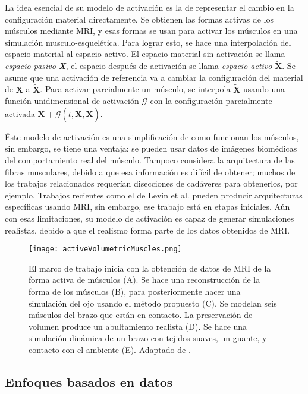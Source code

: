 La idea esencial de su modelo de activación es la de representar el cambio en la configuración material directamente. Se obtienen las formas activas de los músculos mediante MRI, y esas formas se usan para activar los músculos en una simulación musculo-esquelética. Para lograr esto, se hace una interpolación del espacio material al espacio activo. El espacio material sin activación se llama \textit{espacio pasivo} \textbf{\textit{X}}, el espacio después de activación se llama \textit{espacio activo} $\tilde{\textbf{X}}$. Se asume que una activación de referencia va a cambiar la configuración del material de $\textbf{X}$ a $\tilde{\textbf{X}}$. Para activar parcialmente un músculo, se interpola $\tilde{\textbf{X}}$ usando una función unidimensional de activación $\mathcal{G}$ con la configuración parcialmente activada $\textbf{X} + \mathcal{G}(t,\tilde{\textbf{X}},\textbf{X})$.

Éste modelo de activación es una simplificación de como funcionan los músculos, sin embargo, se tiene una ventaja: se pueden usar datos de imágenes biomédicas del comportamiento real del músculo. Tampoco considera la arquitectura de las fibras musculares, debido a que esa información es difícil de obtener; muchos de los trabajos relacionados requerían disecciones de cadáveres para obtenerlos, por ejemplo. Trabajos recientes como el de Levin et al. \citep{levin2011extracting} pueden producir arquitecturas específicas usando MRI, sin embargo, ese trabajo está en etapas iniciales. Aún con esas limitaciones, su modelo de activación es capaz de generar simulaciones realistas, debido a que el realismo forma parte de los datos obtenidos de MRI.

\begin{figure}
	\centering
		\texttt{[image: activeVolumetricMuscles.png]}
	\caption[Marco de trabajo para simular músculos volumétricos con sólidos Eulerianos-Lagrangianos.]{ El marco de trabajo inicia con la obtención de datos de MRI de la forma activa de músculos (A). Se hace una reconstrucción de la forma de los músculos (B), para posteriormente hacer una simulación del ojo usando el método propuesto (C). Se modelan seis músculos del brazo que están en contacto. La preservación de volumen produce un abultamiento realista (D). Se hace una simulación dinámica de un brazo con tejidos suaves, un guante, y contacto con el ambiente (E).
	Adaptado de \citep{fan2014active}.}
		\label{fig:activeVolumetricMuscles}
\end{figure}

\subsection{Enfoques basados en datos}

